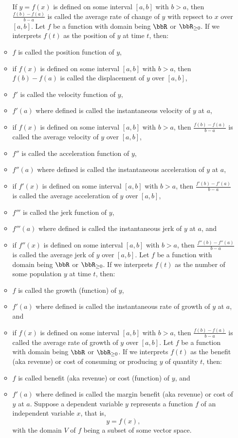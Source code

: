 \documentclass[a4paper,12pt]{report}
\begin{document}
\begin{itemize}
\begin{itemize}
If $y=f(x)$ is defined on some interval $[a,b]$ with $b>a$, then $\frac{f(b)-f(a)}{b-a}$ is called the average rate of change of $y$ with repsect to $x$ over $[a,b]$.
Let $f$ be a function with domain being $\bbR$ or $\bbR_{\geq 0}$. If we interprets $f(t)$ as the position of $y$ at time $t$, then:
\bit
\item $f$ is called the position function of $y$,
\item if $f(x)$ is defined on some interval $[a,b]$ with $b>a$, then $f(b)-f(a)$ is called the displacement of $y$ over $[a,b]$,
\item $f'$ is called the velocity function of $y$,
\item $f'(a)$ where defined is called the instantaneous velocity of $y$ at $a$,
\item if $f(x)$ is defined on some interval $[a,b]$ with $b>a$, then $\frac{f(b)-f(a)}{b-a}$ is called the average velocity of $y$ over $[a,b]$,
\item $f''$ is called the acceleration function of $y$,
\item $f''(a)$ where defined is called the instantaneous acceleration of $y$ at $a$,
\item if $f'(x)$ is defined on some interval $[a,b]$ with $b>a$, then $\frac{f'(b)-f'(a)}{b-a}$ is called the average acceleration of $y$ over $[a,b]$,
\item $f'''$ is called the jerk function of $y$,
\item $f'''(a)$ where defined is called the instantaneous jerk of $y$ at $a$, and
\item if $f''(x)$ is defined on some interval $[a,b]$ with $b>a$, then $\frac{f''(b)-f''(a)}{b-a}$ is called the average jerk of $y$ over $[a,b]$.
\eit
{}
Let $f$ be a function with domain being $\bbR$ or $\bbR_{\geq 0}$. If we interprets $f(t)$ as the number of some population $y$ at time $t$, then:
\bit
\item $f$ is called the growth (function) of $y$,
\item $f'(a)$ where defined is called the instantaneous rate of growth of $y$ at $a$, and
\item if $f(x)$ is defined on some interval $[a,b]$ with $b>a$, then $\frac{f(b)-f(a)}{b-a}$ is called the average rate of growth of $y$ over $[a,b]$.
\eit
{}
Let $f$ be a function with domain being $\bbR$ or $\bbR_{\geq 0}$. If we interprets $f(t)$ as the benefit (aka revenue) or cost of consuming or producing $y$ of quantity $t$, then:
\bit
\item $f$ is called benefit (aka revenue) or cost (function) of $y$, and
\item $f'(a)$ where defined is called the margin benefit (aka revenue) or cost of $y$ at $a$.
\eit
{}
Suppose a dependent variable $y$ represents a function $f$ of an independent variable $x$, that is,
\[y=f(x),\]
with the domain $V$ of $f$ being a subset of some vector space.


\end{itemize}
\end{itemize}
\end{document}
